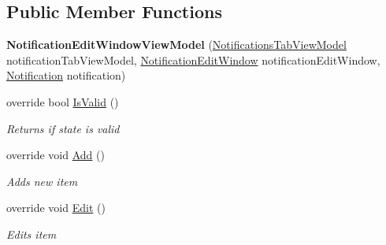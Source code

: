\subsection*{Public Member Functions}
\begin{DoxyCompactItemize}
\item 
\hypertarget{class_baudi_1_1_client_1_1_view_models_1_1_edit_window_view_models_1_1_notification_edit_window_view_model_aa10881b86890f439bbb1acc9591c787d}{}{\bfseries Notification\+Edit\+Window\+View\+Model} (\hyperlink{class_baudi_1_1_client_1_1_view_models_1_1_tabs_view_models_1_1_notifications_tab_view_model}{Notifications\+Tab\+View\+Model} notification\+Tab\+View\+Model, \hyperlink{class_baudi_1_1_client_1_1_view_1_1_edit_windows_1_1_notification_edit_window}{Notification\+Edit\+Window} notification\+Edit\+Window, \hyperlink{class_baudi_1_1_d_a_l_1_1_models_1_1_notification}{Notification} notification)\label{class_baudi_1_1_client_1_1_view_models_1_1_edit_window_view_models_1_1_notification_edit_window_view_model_aa10881b86890f439bbb1acc9591c787d}

\item 
override bool \hyperlink{class_baudi_1_1_client_1_1_view_models_1_1_edit_window_view_models_1_1_notification_edit_window_view_model_a3dd14080d055dab5c537805c427ef784}{Is\+Valid} ()
\begin{DoxyCompactList}\small\item\em Returns if state is valid \end{DoxyCompactList}\item 
override void \hyperlink{class_baudi_1_1_client_1_1_view_models_1_1_edit_window_view_models_1_1_notification_edit_window_view_model_a0a68c1145c298a30ef9351b396e25730}{Add} ()
\begin{DoxyCompactList}\small\item\em Adds new item \end{DoxyCompactList}\item 
override void \hyperlink{class_baudi_1_1_client_1_1_view_models_1_1_edit_window_view_models_1_1_notification_edit_window_view_model_ade7361440d2171e32dcfb52ac8b1520b}{Edit} ()
\begin{DoxyCompactList}\small\item\em Edits item \end{DoxyCompactList}\end{DoxyCompactItemize}
